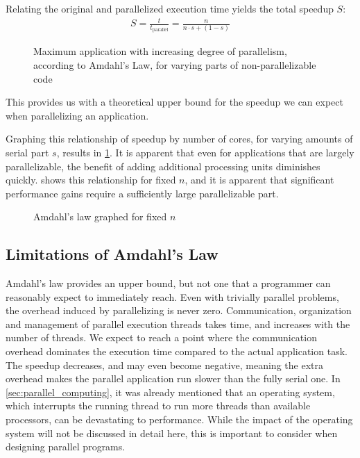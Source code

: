 \documentclass[BCOR20mm,DIV14,10pt,headinclude,footexclude,bibtotoc,liststotoc]{article}
\begin{document}
Relating the original and parallelized execution time yields the total speedup
$S$:
\begin{eqnarray}
	S = \frac{t}{t_\text{parallel}} = \frac{n}{n \cdot s + (1-s)}
\end{eqnarray}

\begin{figure}
	\centering
	
	\caption{Maximum application with increasing degree of parallelism, according to Amdahl's Law, for varying parts of non-parallelizable code}
	\label{fig:amdahl}
\end{figure}

This provides us with a theoretical upper bound for the speedup we can expect
when parallelizing an application.

Graphing this relationship of speedup by number of cores, for varying amounts of
serial part $s$, results in \cref{fig:amdahl}. It is apparent that even for
applications that are largely parallelizable, the benefit of adding additional
processing units diminishes quickly.  shows this
relationship for fixed $n$, and it is apparent that significant performance
gains require a sufficiently large parallelizable part.

\begin{figure}
	\centering
	
	\caption{Amdahl's law graphed for fixed $n$}
	\label{fig:amdahl_inverted}
\end{figure}


\subsection{Limitations of Amdahl's Law}
Amdahl's law provides an upper bound, but not one that a programmer can
reasonably expect to immediately reach. Even with trivially parallel problems,
the overhead induced by parallelizing is never zero. Communication, organization
and management of parallel execution threads takes time, and increases with the
number of threads. We expect to reach a point where the communication overhead
dominates the execution time compared to the actual application task. The
speedup decreases, and may even become negative, meaning the extra overhead
makes the parallel application run slower than the fully serial one. In
\cref{sec:parallel_computing}, it was already mentioned that an operating
system, which interrupts the running thread to run more threads than available
processors, can be devastating to performance. While the impact of the operating
system will not be discussed in detail here, this is important to consider when
designing parallel programs.
\end{document}
